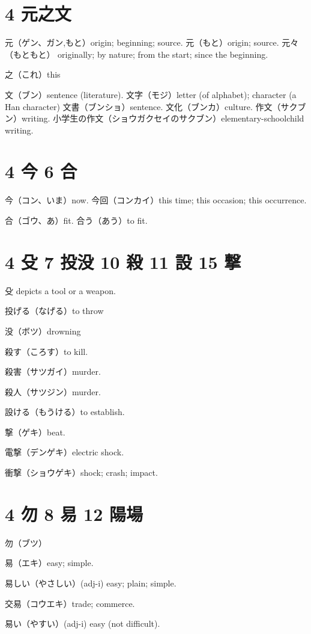 \section{4 元之文}

元（ゲン、ガン,もと）origin; beginning; source.
元（もと）origin; source.
元々（もともと）
originally; by nature; from the start; since the beginning.

之（これ）this

文（ブン）sentence (literature).
文字（モジ）letter (of alphabet); character (a Han character)
文書（ブンショ）sentence.
文化（ブンカ）culture.
作文（サクブン）writing.
小学生の作文（ショウガクセイのサクブン）elementary-schoolchild writing.

\section{4 今 6 合}

今（コン、いま）now.
今回（コンカイ）this time; this occasion; this occurrence.

合（ゴウ、あ）fit.
合う（あう）to fit.

\section{4 殳 7 投没 10 殺 11 設 15 撃}

殳 depicts a tool or a weapon.

投げる（なげる）to throw

没（ボツ）drowning

殺す（ころす）to kill.

殺害（サツガイ）murder.

殺人（サツジン）murder.

設ける（もうける）to establish.

撃（ゲキ）beat.

電撃（デンゲキ）electric shock.

衝撃（ショウゲキ）shock; crash; impact.

\section{4 勿 8 易 12 陽場}

勿（ブツ）

易（エキ）easy; simple.

易しい（やさしい）(adj-i) easy; plain; simple.

交易（コウエキ）trade; commerce.

易い（やすい）(adj-i) easy (not difficult).

